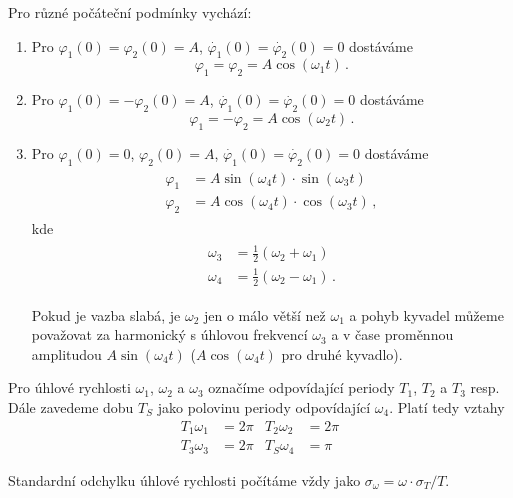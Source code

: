 Pro různé počáteční podmínky vychází:
\begin{enumerate}
\item Pro $\varphi _1 (0) = \varphi _2 (0) = A$, $\dot{\varphi_1}(0)=\dot{\varphi_2}(0)=0$ dostáváme
\begin{equation} \label{eq::philist1}
\varphi _1 = \varphi _2 = A \cos(\omega _1 t)\,.
\end{equation}
\item Pro $\varphi _1 (0) = - \varphi _2 (0) = A$, $\dot{\varphi_1}(0)=\dot{\varphi_2}(0)=0$ dostáváme
\begin{equation} \label{eq::philist2}
\varphi _1 = - \varphi _2 = A \cos(\omega _2 t) \,.
\end{equation}
\item Pro $\varphi _1 (0) = 0$, $\varphi _2 (0) = A$, $\dot{\varphi_1}(0)=\dot{\varphi_2}(0)=0$ dostáváme
\begin{align}
\label{eq::philist3}
\begin{split}
 \varphi_1 &= A \sin(\omega_4 t) \cdot \sin(\omega_3 t)
\\
 \varphi_2 &= A \cos(\omega_4 t) \cdot \cos(\omega_3 t) \,,
\end{split}
\end{align}
kde
\begin{align}
\label{eq::omega34}
\begin{split}
 \omega_3 &= \frac{1}{2}(\omega_2 + \omega_1)
\\
 \omega_4 &= \frac{1}{2}(\omega_2 - \omega_1) \,.
\end{split}
\end{align}

Pokud je vazba slabá, je $\omega _2$ jen o málo větší než $\omega_1$ a pohyb kyvadel můžeme považovat za harmonický s úhlovou frekvencí $\omega_3$ a v čase proměnnou amplitudou $A \sin(\omega_4 t)$ ($A \cos(\omega_4 t)$ pro druhé kyvadlo). 

\end{enumerate}

Pro úhlové rychlosti $\omega_1$, $\omega_2$ a $\omega_3$ označíme odpovídající periody $T_1$, $T_2$ a $T_3$ resp.
Dále zavedeme dobu $T_S$ jako polovinu periody odpovídající $\omega_4$. Platí tedy vztahy
\begin{align}
\label{eq::periodyvztahy}
 T_1 \omega_1 &= 2\pi & T_2 \omega_2 &=2\pi \nonumber \\
 T_3 \omega_3 &= 2\pi & T_S \omega_4 &=\pi
\end{align}

Standardní odchylku úhlové rychlosti počítáme vždy jako $\sigma_\omega=\omega \cdot \sigma_T / T$.

